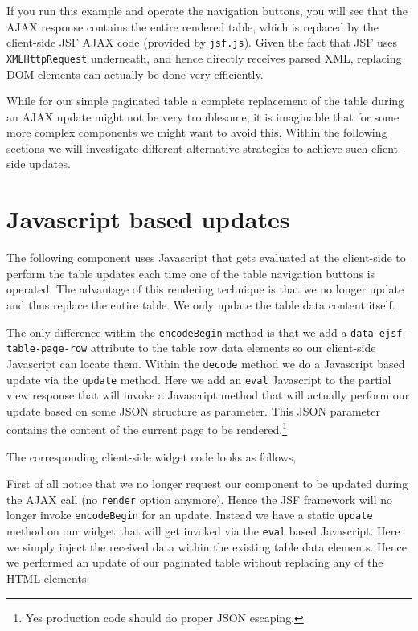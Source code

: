 If you run this example and operate the navigation buttons, you will see that the AJAX response contains the entire rendered table, which is replaced by the client-side JSF AJAX code (provided by \texttt{jsf.js}).
Given the fact that JSF uses \texttt{XMLHttpRequest} underneath, and hence directly receives parsed XML, replacing DOM elements can actually be done very efficiently.

While for our simple paginated table a complete replacement of the table during an AJAX update might not be very troublesome, it is imaginable that for some more complex components we might want to avoid this.
Within the following sections we will investigate different alternative strategies to achieve such client-side updates.


\section{Javascript based updates}
The following component uses Javascript that gets evaluated at the client-side to perform the table updates each time one of the table navigation buttons is operated.
The advantage of this rendering technique is that we no longer update and thus replace the entire table. We only update the table data content itself.

The only difference within the \texttt{encodeBegin} method is that we add a \texttt{data-ejsf-table-\allowbreak page-row} attribute to the table row data elements so our client-side Javascript can locate them.
Within the \texttt{decode} method we do a Javascript based update via the \texttt{update} method.
Here we add an \texttt{eval} Javascript to the partial view response that will invoke a Javascript method that will actually perform our update based on some JSON structure as parameter.
This JSON parameter contains the content of the current page to be rendered.\footnote{Yes production code should do proper JSON escaping.}

The corresponding client-side widget code looks as follows,

First of all notice that we no longer request our component to be updated during the AJAX call (no \texttt{render} option anymore).
Hence the JSF framework will no longer invoke \texttt{encodeBegin} for an update.
Instead we have a static \texttt{update} method on our widget that will get invoked via the \texttt{eval} based Javascript.
Here we simply inject the received data within the existing table data elements.
Hence we performed an update of our paginated table without replacing any of the HTML elements.


